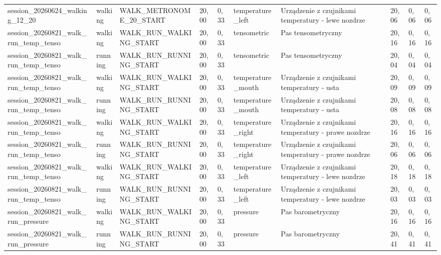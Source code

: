 \begin{table}[!htbp]
{\begin{tabular}{llllllllll}
session\_20260624\_walking\_12\_20 & walking & WALK\_METRONOME\_20\_START & 20,00 & 0,33 & temperature\_left & Urządzenie z czujnikami temperatury - lewe nozdrze & 20,06 & 0,06 & 0,06 \\
session\_20260821\_walk\_run\_temp\_tenso & walking & WALK\_RUN\_WALKING\_START & 20,00 & 0,33 & tensometric & Pas tensometryczny & 20,16 & 0,16 & 0,16 \\
session\_20260821\_walk\_run\_temp\_tenso & running & WALK\_RUN\_RUNNING\_START & 20,00 & 0,33 & tensometric & Pas tensometryczny & 20,04 & 0,04 & 0,04 \\
session\_20260821\_walk\_run\_temp\_tenso & walking & WALK\_RUN\_WALKING\_START & 20,00 & 0,33 & temperature\_mouth & Urządzenie z czujnikami temperatury - usta & 20,09 & 0,09 & 0,09 \\
session\_20260821\_walk\_run\_temp\_tenso & running & WALK\_RUN\_RUNNING\_START & 20,00 & 0,33 & temperature\_mouth & Urządzenie z czujnikami temperatury - usta & 20,08 & 0,08 & 0,08 \\
session\_20260821\_walk\_run\_temp\_tenso & walking & WALK\_RUN\_WALKING\_START & 20,00 & 0,33 & temperature\_right & Urządzenie z czujnikami temperatury - prawe nozdrze & 20,16 & 0,16 & 0,16 \\
session\_20260821\_walk\_run\_temp\_tenso & running & WALK\_RUN\_RUNNING\_START & 20,00 & 0,33 & temperature\_right & Urządzenie z czujnikami temperatury - prawe nozdrze & 20,06 & 0,06 & 0,06 \\
session\_20260821\_walk\_run\_temp\_tenso & walking & WALK\_RUN\_WALKING\_START & 20,00 & 0,33 & temperature\_left & Urządzenie z czujnikami temperatury - lewe nozdrze & 20,18 & 0,18 & 0,18 \\
session\_20260821\_walk\_run\_temp\_tenso & running & WALK\_RUN\_RUNNING\_START & 20,00 & 0,33 & temperature\_left & Urządzenie z czujnikami temperatury - lewe nozdrze & 20,03 & 0,03 & 0,03 \\
session\_20260821\_walk\_run\_pressure & walking & WALK\_RUN\_WALKING\_START & 20,00 & 0,33 & pressure & Pas barometryczny & 20,16 & 0,16 & 0,16 \\
session\_20260821\_walk\_run\_pressure & running & WALK\_RUN\_RUNNING\_START & 20,00 & 0,33 & pressure & Pas barometryczny & 20,41 & 0,41 & 0,41 \\
\bottomrule
\end{tabular}
}
\end{table}
